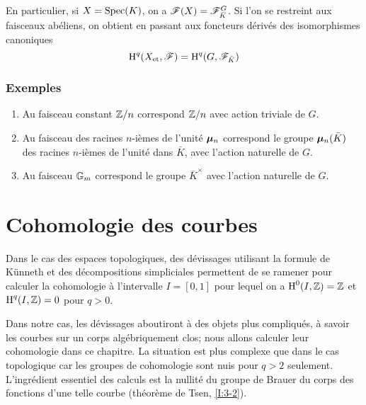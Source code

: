 \documentclass[oneside]{book}
\begin{document}
En particulier, si $X=\operatorname{Spec}(K)$, on a $\mathscr{F}(X) = \mathscr{F}_{\bar K}^G$. Si l'on se 
restreint aux faisceaux abéliens, on obtient en passant aux foncteurs 
dérivés des isomorphismes canoniques 
\[
  \operatorname{H}^q({X}_{\textnormal{et}},\mathscr{F}) = \operatorname{H}^q(G,\mathscr{F}_{\bar K})
\]





\subsubsection{Exemples}\label{I:2-4-5}

\begin{enumerate}[\indent a)]
  \item Au faisceau constant $\mathbb{Z}/n$ correspond $\mathbb{Z}/n$ avec action triviale de 
    $G$. 
  \item Au faisceau des racines $n$-ièmes de l'unité ${\bm\mu}_n$ correspond 
    le groupe ${\bm\mu}_n(\bar K)$ des racines $n$-ièmes de l'unité dans 
    $\bar K$, avec l'action naturelle de $G$.
  \item Au faisceau $\mathbb{G}_m$ correspond le groupe $\bar K^\times$ avec l'action 
    naturelle de $G$.
\end{enumerate}




















\section{Cohomologie des courbes}\label{I:3}

Dans le cas des espaces topologiques, des dévissages utilisant la formule de 
K\"unneth et des décompositions simpliciales permettent de se ramener pour 
calculer la cohomologie à l'intervalle $I=[0,1]$ pour lequel on a 
$\operatorname{H}^0(I,\mathbb{Z})=\mathbb{Z}$ et $\operatorname{H}^q(I,\mathbb{Z})=0$ pour $q>0$. 

Dans notre cas, les dévissages aboutiront à des objets plus compliqués, 
à savoir les courbes sur un corps algébriquement clos; nous allons calculer 
leur cohomologie dans ce chapitre. La situation est plus complexe que dans le 
cas topologique car les groupes de cohomologie sont nuis pour $q>2$ seulement. 
L'ingrédient essentiel des calculs est la nullité du groupe de Brauer du 
corps des fonctions d'une telle courbe (théorème de Tsen, \ref{I:3-2}). 
\end{document}
